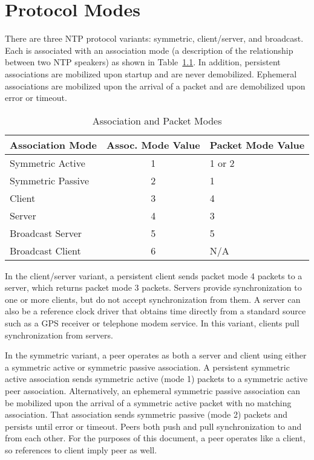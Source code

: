 \chapter{Protocol Modes}
\label{section-3}

There are three NTP protocol variants: symmetric, client/server, and
broadcast. Each is associated with an association mode (a
description of the relationship between two NTP speakers) as shown in
Table~\ref{association_and_packet_modes}. In addition, persistent associations are mobilized upon
startup and are never demobilized. Ephemeral associations are
mobilized upon the arrival of a packet and are demobilized upon error
or timeout.

\begin{table}[htb]
  \center
  \begin{tabular}{| l | c | l |}
    \hline
    Association Mode & Assoc. Mode Value & Packet Mode Value \\
    \hline
    \hline
    Symmetric Active & 1 & 1 or 2 \\
    Symmetric Passive & 2 & 1 \\
    Client & 3 & 4 \\
    Server & 4 & 3 \\
    Broadcast Server & 5 & 5 \\
    Broadcast Client & 6 & N/A \\
    \hline
  \end{tabular}
  \caption{Association and Packet Modes}
  \label{association_and_packet_modes}
\end{table}

In the client/server variant, a persistent client sends packet mode 4
packets to a server, which returns packet mode 3 packets. Servers
provide synchronization to one or more clients, but do not accept
synchronization from them. A server can also be a reference clock
driver that obtains time directly from a standard source such as a
GPS receiver or telephone modem service. In this variant, clients
pull synchronization from servers.

In the symmetric variant, a peer operates as both a server and client
using either a symmetric active or symmetric passive association. A
persistent symmetric active association sends symmetric active (mode
1) packets to a symmetric active peer association. Alternatively, an
ephemeral symmetric passive association can be mobilized upon the
arrival of a symmetric active packet with no matching association.
That association sends symmetric passive (mode 2) packets and
persists until error or timeout. Peers both push and pull
synchronization to and from each other. For the purposes of this
document, a peer operates like a client, so references to client
imply peer as well.

